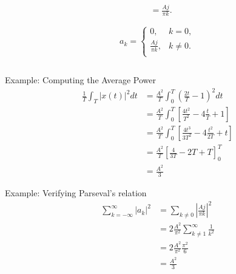 \begin{frame}
\begin{columns}
\begin{column}{0.5\textwidth}
\begin{align*}
                 &= \frac{Aj}{\pi k}.
            \end{align*}
            \pause
            \begin{equation*}
                a_k = \begin{cases} 0, & k = 0,\\ \frac{Aj}{\pi k},& k \neq 0.\\
                \end{cases}
            \end{equation*}
        \end{column}
    \end{columns}
\end{frame}


\begin{frame}
Example: Computing the Average Power
    \begin{align*}
        \frac{1}{T}\int_T |x(t)|^2dt &= \frac{A^2}{T}\int_0^T  \left(\frac{2t}{T} - 1\right)^2dt\\
        &=  \frac{A^2}{T}\int_0^T  \left[ \frac{4t^2}{T^2} - 4\frac{t}{T} + 1\right]\\
        &=  \frac{A^2}{T}\int_0^T  \left[ \frac{4t^3}{3T^2} - 4\frac{t^2}{2T} + t\right]\\
        &=  \frac{A^2}{T}\left[ \frac{4}{3T} - 2T + T\right]_0^T\\
        &= \frac{A^2}{3}
    \end{align*}
\end{frame}



\begin{frame}
Example: Verifying Parseval's relation
    \begin{align*}
        \sum_{k=-\infty}^{\infty}|a_k|^2 &= \sum_{k \neq 0}\left|\frac{Aj}{\pi k} \right|^2\\
        &=  2\frac{A^2}{\pi^2}\sum_{k \neq 1}^{\infty}\frac{1}{ k^2}\\
        &= 2\frac{A^2}{\pi^2}\frac{\pi^2}{6}\\
        &= \frac{A^2}{3}
    \end{align*}
\end{frame}




